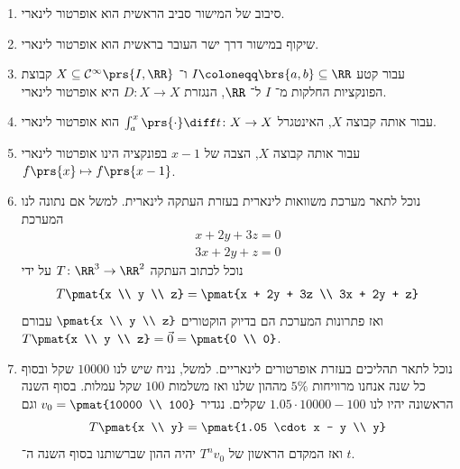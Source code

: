 \documentclass[a4paper,10pt,twoside,openany]{book}
\begin{document}
\begin{examples}
\begin{enumerate}
\item סיבוב של המישור סביב הראשית הוא אופרטור לינארי.

\item שיקוף במישור דרך ישר העובר בראשית הוא אופרטור לינארי.

\item עבור
קטע
$I \coloneqq \brs{a,b} \subseteq \RR$
ו־%
$X \subseteq \mathcal{C}^\infty\prs{I,\RR}$
קבוצת הפונקציות החלקות מ־%
$I$
ל־%
$\RR$,
הנגזרת
$D \colon X \to X$
היא אופרטור לינארי.

\item עבור אותה קבוצה
$X$,
האינטגרל
$\int_a^x \prs{\cdot} \diff t \colon X \to X$
הוא אופרטור לינארי.

\item עבור אותה קבוצה
$X$,
הצבה של
$x-1$
בפונקציה הינו אופרטור לינארי
$f\prs{x} \mapsto f\prs{x-1}$.

\item נוכל לתאר מערכת משוואות לינארית בעזרת העתקה לינארית.
למשל אם נתונה לנו המערכת
\begin{align*}
x + 2y + 3z = 0 \\
3x + 2y + z = 0
\end{align*}
נוכל לכתוב העתקה
$T \colon \RR^3 \to \RR^2$
על ידי
\begin{align*}
T\pmat{x \\ y \\ z} = \pmat{x + 2y + 3z \\ 3x + 2y + z}
\end{align*}
ואז פתרונות המערכת הם בדיוק הוקטורים
$\pmat{x \\ y \\ z}$
עבורם
$T \pmat{x \\ y \\ z} = \vec{0} = \pmat{0 \\ 0}$.

\item נוכל לתאר תהליכים בעזרת אופרטורים לינאריים. למשל, נניח שיש לנו
$10000$
שקל ובסוף כל שנה אנחנו מרוויחות
$5\%$
מההון שלנו ואז משלמות
$100$
שקל עמלות.
בסוף השנה הראשונה יהיו לנו
$1.05 \cdot 10000 - 100$
שקלים. נגדיר
$v_0 = \pmat{10000 \\ 100}$
וגם
\[T\pmat{x \\ y} = \pmat{1.05 \cdot x - y \\ y}\]
ואז המקדם הראשון של
$T^n v_0$
יהיה ההון שברשותנו בסוף השנה ה־%
$t$.
\end{enumerate}
\end{examples}
\end{document}
